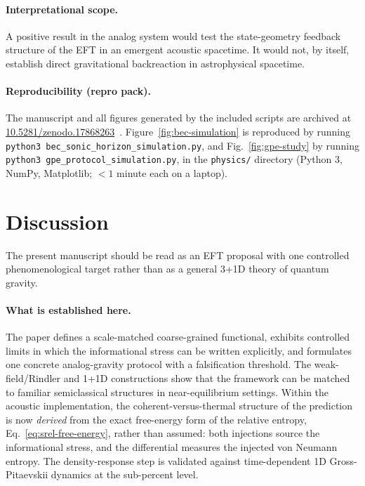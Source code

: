 \documentclass[aps,prd,twocolumn,superscriptaddress,nofootinbib,floatfix]{revtex4-2}
\begin{document}
\paragraph{Interpretational scope.}
A positive result in the analog system would test the state-geometry feedback structure of the EFT in an emergent acoustic spacetime. It would not, by itself, establish direct gravitational backreaction in astrophysical spacetime.

\paragraph{Reproducibility (repro pack).}
The manuscript and all figures generated by the included scripts are archived at \href{https://doi.org/10.5281/zenodo.17868263}{10.5281/zenodo.17868263}~\cite{AhmannZenodoCoherism2025}.
Figure~\ref{fig:bec-simulation} is reproduced by running \texttt{python3 bec\_sonic\_horizon\_simulation.py}, and Fig.~\ref{fig:gpe-study} by running \texttt{python3 gpe\_protocol\_simulation.py}, in the \texttt{physics/} directory (Python 3, NumPy, Matplotlib; $<1$ minute each on a laptop).


\section{Discussion}
\label{sec:discussion}

The present manuscript should be read as an EFT proposal with one controlled phenomenological target rather than as a general 3+1D theory of quantum gravity.

\paragraph{What is established here.}
The paper defines a scale-matched coarse-grained functional, exhibits controlled limits in which the informational stress can be written explicitly, and formulates one concrete analog-gravity protocol with a falsification threshold. The weak-field/Rindler and 1+1D constructions show that the framework can be matched to familiar semiclassical structures in near-equilibrium settings. Within the acoustic implementation, the coherent-versus-thermal structure of the prediction is now \emph{derived} from the exact free-energy form of the relative entropy, Eq.~\eqref{eq:srel-free-energy}, rather than assumed: both injections source the informational stress, and the differential measures the injected von Neumann entropy. The density-response step is validated against time-dependent 1D Gross-Pitaevskii dynamics at the sub-percent level.
\end{document}
